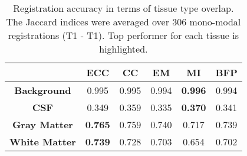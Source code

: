 \begin{table}[htbp]
  \centering
  {\small
    \begin{tabular}{cccccc}
    \toprule
    \textbf{} & \textbf{ECC} & \textbf{CC} & \textbf{EM} & \textbf{MI} & \textbf{BFP}\\
    \midrule
    \textbf{Background} & 0.995 & 0.995 & 0.994 & \textbf{0.996} & 0.994\\
    \textbf{CSF} & 0.349 & 0.359 &0.335 &  \textbf{0.370} & 0.341\\
    \textbf{Gray Matter} & \textbf{0.765} & 0.759 & 0.740 & 0.717 & 0.739\\
    \textbf{White Matter} & \textbf{0.739} & 0.728 & 0.703 & 0.654 & 0.702\\
    \bottomrule
    \end{tabular}%
    \caption{{\small Registration accuracy in terms of tissue type overlap. The Jaccard indices were averaged over 306 mono-modal registrations (T1 - T1). Top performer for each tissue is highlighted.}}
  \label{tab:monomodal_results_segTri_fill}}%
\end{table}%
